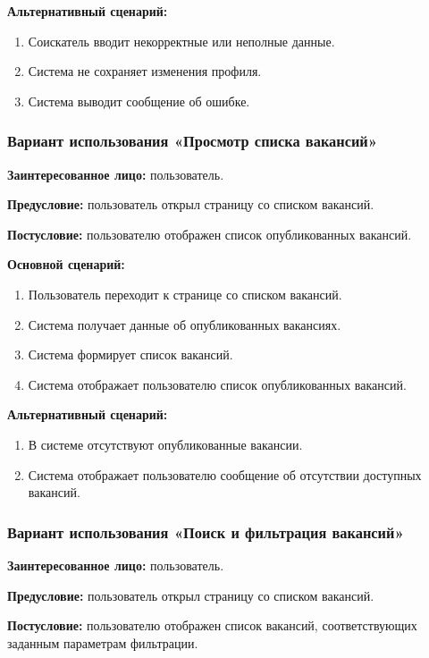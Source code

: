 \textbf{Альтернативный сценарий:}
\begin{enumerate}
	\item Соискатель вводит некорректные или неполные данные.
	\item Система не сохраняет изменения профиля.
	\item Система выводит сообщение об ошибке.
\end{enumerate}

\subsubsection{Вариант использования «Просмотр списка вакансий»}

\textbf{Заинтересованное лицо:} пользователь.

\textbf{Предусловие:} пользователь открыл страницу со списком вакансий.

\textbf{Постусловие:} пользователю отображен список опубликованных вакансий.

\textbf{Основной сценарий:}
\begin{enumerate}
	\item Пользователь переходит к странице со списком вакансий.
	\item Система получает данные об опубликованных вакансиях.
	\item Система формирует список вакансий.
	\item Система отображает пользователю список опубликованных вакансий.
\end{enumerate}

\textbf{Альтернативный сценарий:}
\begin{enumerate}
	\item В системе отсутствуют опубликованные вакансии.
	\item Система отображает пользователю сообщение об отсутствии доступных вакансий.
\end{enumerate}


\subsubsection{Вариант использования «Поиск и фильтрация вакансий»}

\textbf{Заинтересованное лицо:} пользователь.

\textbf{Предусловие:} пользователь открыл страницу со списком вакансий.

\textbf{Постусловие:} пользователю отображен список вакансий, соответствующих заданным параметрам фильтрации.

